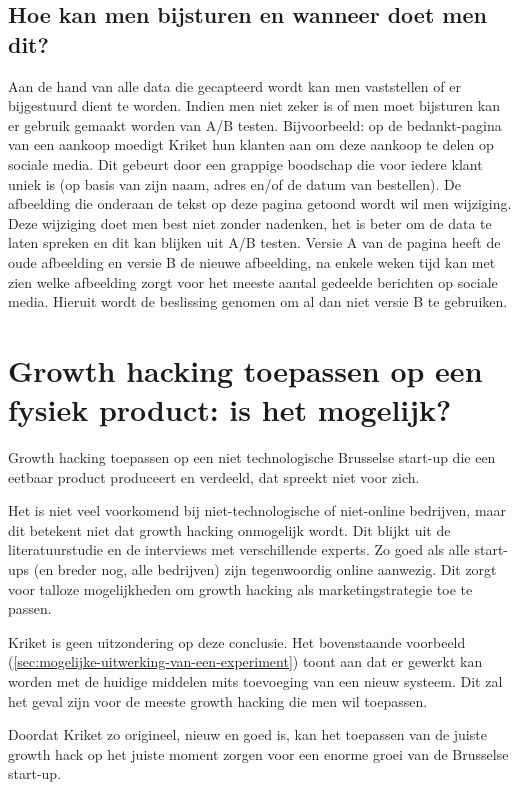 \subsection{Hoe kan men bijsturen en wanneer doet men dit?}
\label{subsec:growth-hack-bijsturen}
Aan de hand van alle data die gecapteerd wordt kan men vaststellen of er bijgestuurd dient te worden. Indien men niet zeker is of men moet bijsturen kan er gebruik gemaakt worden van A/B testen. Bijvoorbeeld: op de bedankt-pagina van een aankoop moedigt Kriket hun klanten aan om deze aankoop te delen op sociale media. Dit gebeurt door een grappige boodschap die voor iedere klant uniek is (op basis van zijn naam, adres en/of de datum van bestellen). De afbeelding die onderaan de tekst op deze pagina getoond wordt wil men wijziging. Deze wijziging doet men best niet zonder nadenken, het is beter om de data te laten spreken en dit kan blijken uit A/B testen. Versie A van de pagina heeft de oude afbeelding en versie B de nieuwe afbeelding, na enkele weken tijd kan met zien welke afbeelding zorgt voor het meeste aantal gedeelde berichten op sociale media. Hieruit wordt de beslissing genomen om al dan niet versie B te gebruiken.
 
\section{Growth hacking toepassen op een fysiek product: is het mogelijk?}
\label{sec:growth-hacking-mogelijk}
Growth hacking toepassen op een niet technologische Brusselse start-up die een eetbaar product produceert en verdeeld, dat spreekt niet voor zich. 

Het is niet veel voorkomend bij niet-technologische of niet-online bedrijven, maar dit betekent niet dat growth hacking onmogelijk wordt. Dit blijkt uit de literatuurstudie en de interviews met verschillende experts. Zo goed als alle start-ups (en breder nog, alle bedrijven) zijn tegenwoordig online aanwezig. Dit zorgt voor talloze mogelijkheden om growth hacking als marketingstrategie toe te passen. 

Kriket is geen uitzondering op deze conclusie. Het bovenstaande voorbeeld (\ref{sec:mogelijke-uitwerking-van-een-experiment}) toont aan dat er gewerkt kan worden met de huidige middelen mits toevoeging van een nieuw systeem. Dit zal het geval zijn voor de meeste growth hacking die men wil toepassen.

Doordat Kriket zo origineel, nieuw en goed is, kan het toepassen van de juiste growth hack op het juiste moment zorgen voor een enorme groei van de Brusselse start-up.  